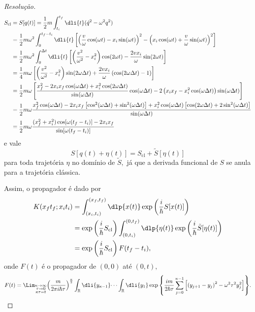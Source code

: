 \begin{proof}[Resolução]
\begin{align*}
      S_{\mathrm{cl}} &= S[q(t)] = \frac12 m\int_{t_i}^{t_f} \dli{t} (\dot{q}^2 - \omega^2 q^2)\\
                      &= \frac12 m\omega^2 \int_{0}^{t_f-t_i} \dli{t} \left[\left(\frac{v}{\omega} \cos(\omega t)- x_i \sin(\omega t)\right)^2 - \left(x_i \cos(\omega t) + \frac{v}{\omega} \sin(\omega t)\right)^2\right]\\
                      &= \frac12 m \omega^2 \int_{0}^{\Delta t} \dli{t} \left[\left(\frac{v^2}{\omega^2} - x_i^2\right) \cos(2 \omega t ) - \frac{2v x_i}{\omega} \sin(2 \omega t)\right]\\
                      &= \frac14 m \omega \left[\left(\frac{v^2}{\omega^2} - x_i^2\right) \sin(2 \omega \Delta t) + \frac{2 v x_i}{\omega} \left(\cos(2 \omega \Delta t) - 1\right)\right]\\
                      &= \frac12 m \omega \left[\frac{x_f^2 - 2x_i x_f \cos(\omega \Delta t) + x_i^2 \cos(2 \omega \Delta t)}{\sin(\omega \Delta t)}\cos(\omega \Delta t) - 2\left(x_i x_f - x_i^2 \cos(\omega \Delta t)\right)\sin(\omega \Delta t)\right]\\
                      &= \frac12 m \omega \frac{x_f^2 \cos(\omega \Delta t) - 2x_i x_f \left[\cos^2(\omega \Delta t) + \sin^2(\omega \Delta t)\right] + x_i^2 \cos(\omega \Delta t) \left[\cos(2 \omega \Delta t) +2\sin^2(\omega \Delta t)\right]}{\sin(\omega \Delta t)}\\
                      &= \frac12 m \omega \frac{(x_f^2 + x_i^2) \cos[\omega (t_f - t_i)] - 2x_i x_f}{\sin[\omega (t_f - t_i)]}
   \end{align*}
   e vale
   \begin{equation*}
      S[q(t) + \eta(t)] = S_{\mathrm{cl}} + \tilde{S}[\eta(t)]
   \end{equation*}
   para toda trajetória \(\eta\) no domínio de \(\tilde{S},\) já que a derivada funcional de \(S\) se anula para a trajetória clássica.

   Assim, o propagador é dado por
   \begin{align*}
      K(x_ft_f; x_it_i) &= \int_{(x_i,t_i)}^{(x_f, t_f)} \dlp{x(t)} \exp\left(\frac{i}{\hbar}S[x(t)]\right)\\
                        &= \exp\left(\frac{i}{\hbar} S_{\mathrm{cl}}\right)\int_{(0, t_i)}^{(0, t_f)} \dlp{\eta(t)} \exp\left(\frac{i}{\hbar} \tilde{S}[\eta(t)]\right)\\
                        &=\exp\left(\frac{i}{\hbar} S_{\mathrm{cl}}\right) F(t_f - t_i),
   \end{align*}
   onde \(F(t)\) é o propagador de \((0,0)\) até \((0,t),\)
   \begin{equation*}
      F(t) = \Lim_{\substack{\kappa \to \infty\\ \tau \to 0\\ \kappa \tau = t}}{\left(\frac{m}{2\pi i \hbar \tau}\right)^{\frac\kappa2}\int_{\mathbb{R}} \dli{y_{\kappa - 1}} \dots \int_{\mathbb{R}} \dli{y_1} \exp\left\{\frac{i m}{ 2 \hbar \tau} \sum_{j = 0}^{\kappa - 1} \left[\left(y_{j+1} - y_j\right)^2 - \omega^2\tau^2 y_j^2\right]\right\}}.
   \end{equation*}


\end{proof}
